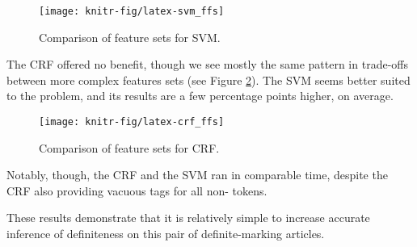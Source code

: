 \documentclass[11pt]{article}\usepackage{graphicx, color}
\newenvironment{knitrout}{}{} %
\begin{document}
\begin{figure}
\begin{knitrout}\small
{}\color{fgcolor}

{\centering \texttt{[image: knitr-fig/latex-svm\_ffs]} 

}



\end{knitrout}

  \caption{Comparison of feature sets for SVM.}\label{fig:svmffs}
\end{figure}


The CRF offered no benefit, though we see mostly the same pattern in trade-offs between more complex features sets (see Figure \ref{fig:crfffs}).
The SVM seems better suited to the problem, and its results are a few percentage points higher, on average.

\begin{figure}
\begin{knitrout}\small
{}\color{fgcolor}

{\centering \texttt{[image: knitr-fig/latex-crf\_ffs]} 

}



\end{knitrout}

  \caption{Comparison of feature sets for CRF.}\label{fig:crfffs}
\end{figure}

Notably, though, the CRF and the SVM ran in comparable time, despite the CRF also providing vacuous tags for all non-\detplaceholder{} tokens.

These results demonstrate that it is relatively simple to increase accurate inference of definiteness on this pair of definite-marking articles.

\end{document}
